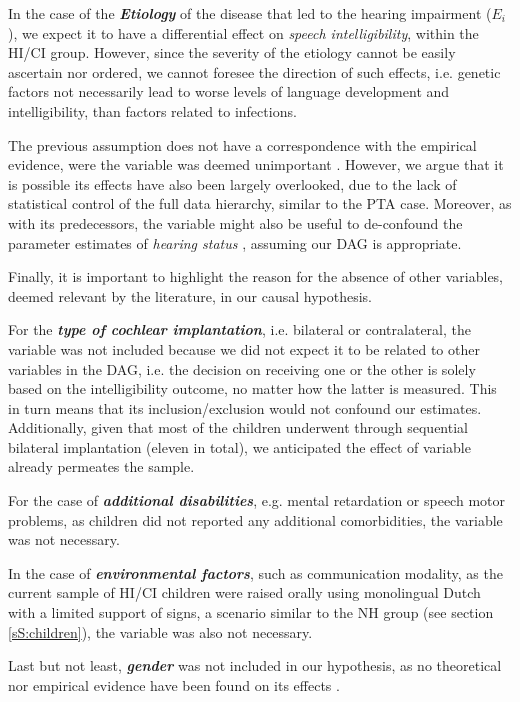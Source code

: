 In the case of the \textbf{\textit{Etiology}} of the disease that led to the hearing impairment ($E_{i}$), we expect it to have a differential effect on \textit{speech intelligibility}, within the HI/CI group. However, since the severity of the etiology cannot be easily ascertain nor ordered, we cannot foresee the direction of such effects, i.e. genetic factors not necessarily lead to worse levels of language development and intelligibility, than factors related to infections.

The previous assumption does not have a correspondence with the empirical evidence, were the variable was deemed unimportant \cite{Boonen_et_al_2021}. However, we argue that it is possible its effects have also been largely overlooked, due to the lack of statistical control of the full data hierarchy, similar to the PTA case. Moreover, as with its predecessors, the variable might also be useful to de-confound the parameter estimates of \textit{hearing status} \cite{Cinelli_et_al_2021}, assuming our DAG is appropriate.

Finally, it is important to highlight the reason for the absence of other variables, deemed relevant by the literature, in our causal hypothesis.

For the \textbf{\textit{type of cochlear implantation}}, i.e. bilateral or contralateral, the variable was not included because we did not expect it to be related to other variables in the DAG, i.e. the decision on receiving one or the other is solely based on the intelligibility outcome, no matter how the latter is measured. This in turn means that its inclusion/exclusion would not confound our estimates. Additionally, given that most of the children underwent through sequential bilateral implantation (eleven in total), we anticipated the effect of variable already permeates the sample.

For the case of \textbf{\textit{additional disabilities}}, e.g. mental retardation or speech motor problems, as children did not reported any additional comorbidities, the variable was not necessary.

In the case of \textbf{\textit{environmental factors}}, such as communication modality, as the current sample of HI/CI children were raised orally using monolingual Dutch with a limited support of signs, a scenario similar to the NH group (see section \ref{sS:children}), the variable was also not necessary.

Last but not least, \textbf{\textit{gender}} was not included in our hypothesis, as no theoretical nor empirical evidence have been found on its effects \cite{Boonen_et_al_2021}.

